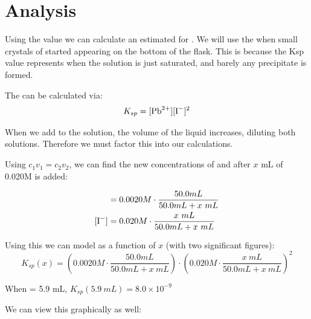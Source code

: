 
\section{Analysis} \label{sec:analysis}
Using the \dv value we can calculate an estimated \ksp for . We will use the \dv when small crystals of  started appearing on the bottom of the flask. This is because the Ksp value represents when the solution is just saturated, and barely any precipitate is formed.

The \ksp can be calculated via:
\begin{equation}
    K_{sp} = [\ce{Pb^{2+}}][{\ce{I^-}}]^2
\end{equation}

When we add  to the solution, the volume of the liquid increases, diluting both solutions. Therefore we must factor this into our calculations.

Using $c_1v_1 = c_2v_2$, we can find the new concentrations of  and  after $x$ mL of 0.020M  is added:

\begin{align}
    [\ce{Pb^{2+}}] &= 0.0020M \cdot \frac{50.0mL}{50.0mL + x~mL} \\
    [\ce{I^-}] &= 0.020M \cdot \frac{x~mL}{50.0mL + x~mL}
\end{align}

Using this we can model \ksp as a function of $x$ (with two significant figures):
\begin{equation}
    K_{sp}(x) = \left(0.0020M \cdot \frac{50.0mL}{50.0mL + x~mL}\right) \cdot \left(0.020M \cdot \frac{x~mL}{50.0mL + x~mL}\right)^2
\end{equation}

When \dv = 5.9 mL, $K_{sp}(5.9~mL) = 8.0 \times 10^{-9}$

We can view this graphically as well:


